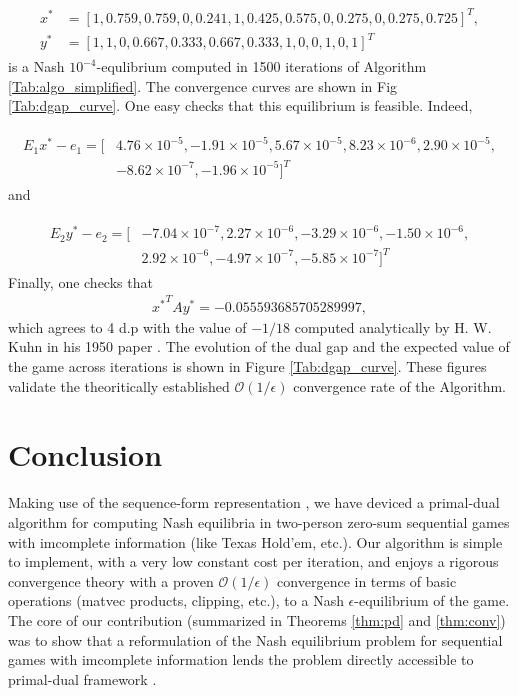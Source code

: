 \documentclass{article} %
\begin{document}
\begin{eqnarray*}
  \begin{split}
    x^* &= [1, 0.759, 0.759, 0, 0.241, 1, 0.425, 0.575, 0, 0.275, 0,
      0.275, 0.725]^T,\\
    y^* &= [1, 1, 0, 0.667, 0.333, 0.667, 0.333, 1, 0, 0, 1, 0, 1]^T
    \end{split}
\end{eqnarray*}
is a Nash $10^{-4}$-equlibrium computed in 1500 iterations of
Algorithm  \ref{Tab:algo_simplified}. The convergence curves are shown
in Fig \ref{Tab:dgap_curve}. One easy checks that this equilibrium is
feasible. Indeed,

\begin{eqnarray*}
  \begin{split}
    E_1x^* - e_1 = [&4.76 \times 10^{-5}, -1.91 \times 10^{-5}, 5.67
      \times 10^{-5}, 8.23 \times 10^{-6}, 2.90 \times 10^{-5}, \\&
      -8.62 \times 10^{-7}, -1.96 \times 10^{-5}]^T
    \end{split}
\end{eqnarray*}
and

\begin{eqnarray*}
  \begin{split}
    E_2y^* - e_2 = [&-7.04 \times 10^{-7}, 2.27 \times 10^{-6}, -3.29
      \times 10^{-6}, -1.50 \times 10^{-6},\\
      &2.92 \times 10^{-6}, -4.97 \times 10^{-7}, -5.85 \times
      10^{-7}]^T
    \end{split}
\end{eqnarray*}
Finally, one checks that
\begin{eqnarray*}
  {x^*}^TAy^* = -0.055593685705289997,
\end{eqnarray*}
 which agrees to 4 d.p with the value of $-1 / 18$ computed
 analytically by H. W. Kuhn in his 1950 paper \cite{kuhn}. The
 evolution of the dual gap and the expected value of the game across
 iterations is shown in Figure \ref{Tab:dgap_curve}. These figures
 validate the theoritically established $\mathcal{O}(1/\epsilon)$
 convergence rate of the Algorithm.


\section{Conclusion}
Making use of the sequence-form representation
\cite{koller1992complexity,von1996efficient,vonequilibrium}, we have
deviced a primal-dual algorithm for computing Nash equilibria in
two-person zero-sum sequential games with imcomplete information (like
Texas Hold'em, etc.). Our algorithm is simple to implement, with a
very low constant cost per iteration, and enjoys a rigorous
convergence theory with a proven $\mathcal{O}(1/\epsilon)$ convergence
in terms of basic operations (matvec products, clipping, etc.), to a
Nash $\epsilon$-equilibrium of the game. The core of our contribution
(summarized in Theorems \ref{thm:pd} and \ref{thm:conv}) was to show
that a reformulation of the Nash equilibrium problem for sequential
games with imcomplete information lends the problem directly
accessible to primal-dual framework
\cite{chambolle2010,chambolle2014ergodic}.
\end{document}

